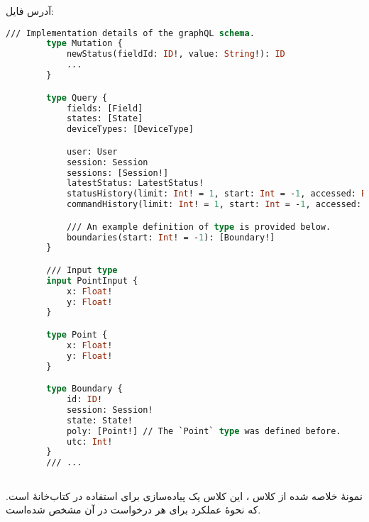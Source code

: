 آدرس فایل:
\hyperref{https://github.com/cardianco/cardian-server/blob/master/src/api/graphql/schema.graphql}{}{}{}
\begin{latin}
	\small
	\begin{lstlisting}[language=graphql, caption={GraphQL Schema.}]
		/// Implementation details of the graphQL schema.
		type Mutation {
			newStatus(fieldId: ID!, value: String!): ID
			...
		}

		type Query {
			fields: [Field]
			states: [State]
			deviceTypes: [DeviceType]

			user: User
			session: Session
			sessions: [Session!]
			latestStatus: LatestStatus!
			statusHistory(limit: Int! = 1, start: Int = -1, accessed: Boolean = null): [Status!]
			commandHistory(limit: Int! = 1, start: Int = -1, accessed: Boolean = null): [Command!]

			/// An example definition of type is provided below.
			boundaries(start: Int! = -1): [Boundary!]
		}

		/// Input type
		input PointInput {
			x: Float!
			y: Float!
		}

		type Point {
			x: Float!
			y: Float!
		}

		type Boundary {
			id: ID!
			session: Session!
			state: State!
			poly: [Point!] // The `Point` type was defined before.
			utc: Int!
		}
		/// ...
	\end{lstlisting}
\end{latin}

\subsection{}
نمونهٔ خلاصه شده از کلاس ، این کلاس یک پیاده‌سازی برای استفاده در کتاب‌خانهٔ  است.
که نحوهٔ عملکرد برای هر درخواست در آن مشخص شده‌است.


